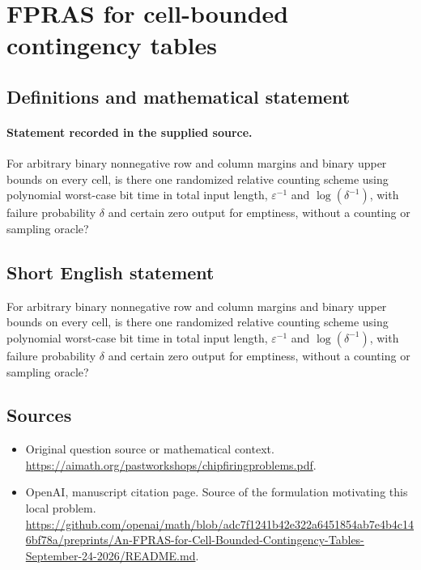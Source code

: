 \documentclass[11pt]{article}
\begin{document}
\section*{FPRAS for cell-bounded contingency tables}\label{30007445}
\subsection{Definitions and mathematical statement}
\paragraph{Statement recorded in the supplied source.}
For arbitrary binary nonnegative row and column margins and binary upper bounds on every cell, is there one randomized relative counting scheme using polynomial worst-case bit time in total input length, $\varepsilon ^{-1}$ and $\log (\delta ^{-1})$, with failure probability $\delta $ and certain zero output for emptiness, without a counting or sampling oracle?
\subsection{Short English statement}
For arbitrary binary nonnegative row and column margins and binary upper bounds on every cell, is there one randomized relative counting scheme using polynomial worst-case bit time in total input length, $\varepsilon ^{-1}$ and $\log (\delta ^{-1})$, with failure probability $\delta $ and certain zero output for emptiness, without a counting or sampling oracle?
\subsection{Sources}
\begin{itemize}
\item[S1] Original question source or mathematical context.
\url{https://aimath.org/pastworkshops/chipfiringproblems.pdf}.
\item[S2] OpenAI, manuscript citation page. Source of the formulation motivating this local problem.
\url{https://github.com/openai/math/blob/adc7f1241b42e322a6451854ab7e4b4c146bf78a/preprints/An-FPRAS-for-Cell-Bounded-Contingency-Tables-September-24-2026/README.md}.
\end{itemize}
\end{document}
